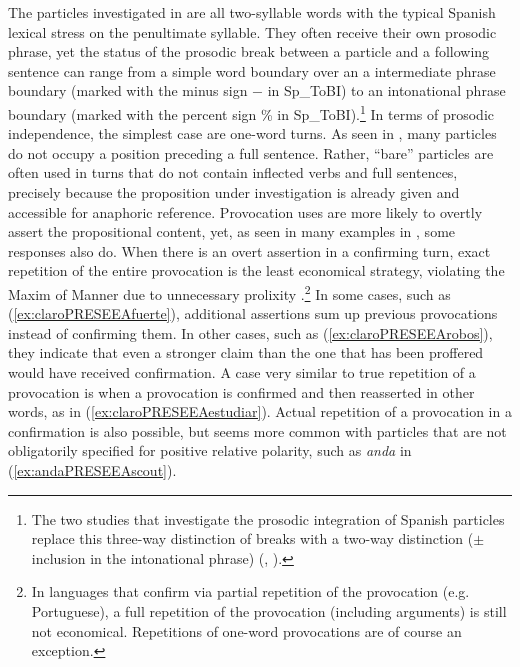 The particles investigated in  are all two-syllable words with the typical Spanish lexical stress on the penultimate syllable. They often receive their own prosodic phrase, yet the status of the prosodic break between a particle and a following sentence can range from a simple word boundary over an a intermediate phrase boundary (marked with the minus sign $-$ in Sp\_ToBI) to an intonational phrase boundary (marked with the percent sign \% in Sp\_ToBI).\footnote{The two studies that investigate the prosodic integration of Spanish particles replace this three-way distinction of breaks with a two-way distinction ($\pm$ inclusion in the intonational phrase) (\cite[208]{CabedoNebot.2013marcadores}, \cite[138]{Tanghe.2015}).} In terms of prosodic independence, the simplest case are one-word turns. As seen in , many particles do not occupy a position preceding a full sentence. Rather, ``bare'' particles are often used in turns that do not contain inflected verbs and full sentences, precisely because the proposition under investigation is already given and accessible for anaphoric reference. Provocation uses are more likely to overtly assert the propositional content, yet, as seen in many examples in , some responses also do. When there is an overt assertion in a confirming turn, exact repetition of the entire provocation is the least economical strategy, violating the Maxim of Manner due to unnecessary prolixity \citep[46]{Grice.1975}.\footnote{In languages that confirm via partial repetition of the provocation (e.g. Portuguese), a full repetition of the provocation (including arguments) is still not economical. Repetitions of one-word provocations are of course an exception.} In some cases, such as (\ref{ex:claroPRESEEAfuerte}), additional assertions sum up previous provocations instead of confirming them. In other cases, such as (\ref{ex:claroPRESEEArobos}), they indicate that even a stronger claim than the one that has been proffered would have received confirmation. A case very similar to true repetition of a provocation is when a provocation is confirmed and then reasserted in other words, as in (\ref{ex:claroPRESEEAestudiar}). Actual repetition of a provocation in a confirmation is also possible, but seems more common with particles that are not obligatorily specified for positive relative polarity, such as \textit{anda} in (\ref{ex:andaPRESEEAscout}).


